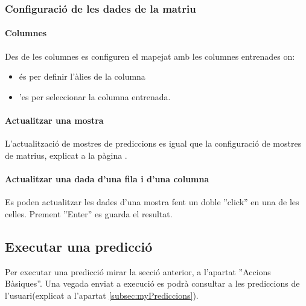 \subsubsection{Configuració de les dades de la matriu}
\paragraph{Columnes} Des de les columnes es configuren el mapejat amb les columnes entrenades on:
\begin{itemize}
\item \iconalias \'{e}s per definir l'\`{a}lies de la columna
\item \iconvariable '{e}s per seleccionar la columna entrenada.
\end{itemize}

\paragraph*{Actualitzar una mostra} L'actualització de mostres de prediccions es igual que la configuració de mostres de matrius, explicat a la p\`{a}gina \pageref{matrixConfiguration}.

\paragraph*{Actualitzar una dada d'una fila i d'una columna} Es poden actualitzar les dades d'una mostra fent un doble ''click'' en una de les celles. Prement ''Enter'' es guarda el resultat.

\subsection{Executar una predicció}
Per executar una predicció mirar la secció anterior, a l'apartat ''Accions Bàsiques''. Una vegada enviat a execució es podr\`{a} consultar a les prediccions de l'usuari(explicat a l'apartat \ref{subsec:myPrediccions}).

